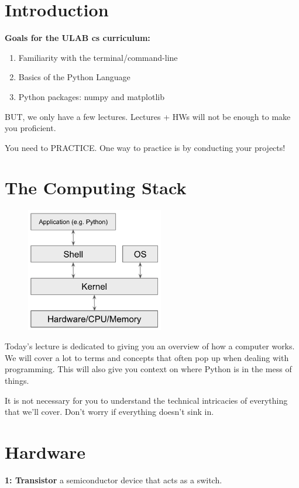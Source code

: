 \documentclass[12pt]{article}
\numberwithin{equation}{section}
\begin{document}
\section{Introduction}
\textbf{Goals for the ULAB cs curriculum:}
\begin{enumerate}
    \item Familiarity with the terminal/command-line
    \item Basics of the Python Language
    \item Python packages: numpy and matplotlib
\end{enumerate}

BUT, we only have a few lectures. Lectures + HWs will not be enough to make you proficient. 

You need to PRACTICE. One way to practice is by conducting your projects!

\section{The Computing Stack}

\begin{figure}[H]
	\centering
	\includegraphics[width=6cm] {stack.png}
\end{figure}

Today's lecture is dedicated to giving you an overview of how a computer works. We will cover a lot to terms and concepts that often pop up when dealing with programming. This will also give you context on where Python is in the mess of things.

It is not necessary for you to understand the technical intricacies of everything that we'll cover. Don't worry if everything doesn't sink in.

\section{Hardware}

\textbf{1: Transistor} a semiconductor device that acts as a switch.
\end{document}
